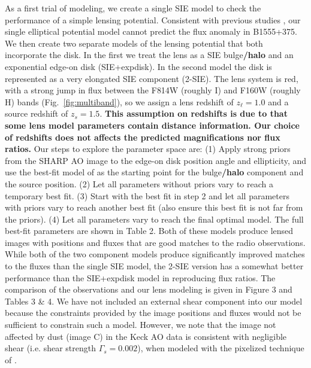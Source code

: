 \documentclass[useAMS,usenatbib]{mn2e}
\begin{document}
As a first trial of modeling, we create a single SIE model to check
the performance of a simple lensing potential. Consistent with
previous studies \citep{Marlow99, Xu14}, our single elliptical
potential model cannot predict the flux anomaly in B1555+375.  We then
create two separate models of the lensing potential that both
incorporate the disk.  In the first we treat the lens as a SIE bulge\textbf{/halo}
and an exponential edge-on disk (SIE+expdisk).  In the second model
the disk is represented as a very elongated SIE component (2-SIE).
The lens system is red, with a strong jump in flux between the F814W
(roughly I) and F160W (roughly H) bands (Fig.~\ref{fig:multiband}), so
we assign a lens redshift of $z_\ell = 1.0$ and a source redshift of
$z_s =1.5$. \textbf{This assumption on redshifts is due to that some lens model parameters contain distance information. Our choice of redshifts does not affects the predicted magnifications nor flux ratios.} Our steps to explore the parameter space are: (1) Apply
strong priors from the SHARP AO image to the edge-on disk position angle
and ellipticity, and use the best-fit model of \citet{Marlow99} as the
starting point for the bulge\textbf{/halo} component and the source position. (2)
Let all parameters without priors vary to reach a temporary best
fit. (3) Start with the best fit in step 2 and let all parameters with
priors vary to reach another best fit (also ensure this best fit is
not far from the priors). (4) Let all parameters vary to reach the
final optimal model.  The full best-fit parameters are shown in Table
2. Both of these models produce lensed images with positions and
fluxes that are good matches to the radio observations.  While both of
the two component models produce significantly improved matches to the
fluxes than the single SIE model, the 2-SIE version has a somewhat
better performance than the SIE+expdisk model in reproducing flux
ratios. The comparison of the observations and our lens modeling is
given in Figure 3 and Tables 3 \& 4.  We have not included an external
shear component into our model because the constraints provided by the
image positions and fluxes would not be sufficient to constrain such a
model. However, we note that the image not affected by dust (image C)
in the Keck AO data is consistent with negligible shear (i.e. shear
strength $\Gamma_s=0.002$), when modeled with the pixelized technique
of \citet{V09}.
\end{document}

